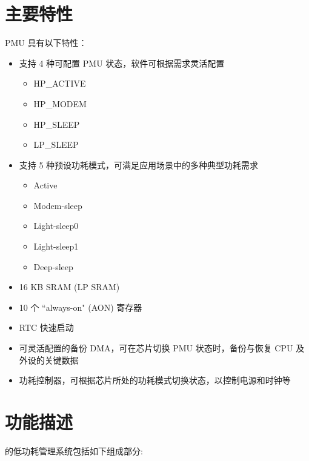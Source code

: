 \documentclass[main\_\_CN.tex]{subfiles}
\begin{document}
\section{主要特性}

PMU 具有以下特性：

\begin{itemize}
    \item 支持 4 种可配置 PMU 状态，软件可根据需求灵活配置
    \begin{itemize}
        \item HP\_ACTIVE
        \item HP\_MODEM
        \item HP\_SLEEP
        \item LP\_SLEEP
    \end{itemize}
    \item 支持 5 种预设功耗模式，可满足应用场景中的多种典型功耗需求
    \begin{itemize}
        \item Active
        \item Modem-sleep
        \item Light-sleep0
        \item Light-sleep1
        \item Deep-sleep
    \end{itemize}
    \item 16 KB SRAM (LP SRAM)
    \item 10 个 ``always-on" (AON) 寄存器
    \item RTC 快速启动
    \item 可灵活配置的备份 DMA，可在芯片切换 PMU 状态时，备份与恢复 CPU 及外设的关键数据
    \item 功耗控制器，可根据芯片所处的功耗模式切换状态，以控制电源和时钟等
\end{itemize}

\section{功能描述}

\chipname{} 的低功耗管理系统包括如下组成部分:
\end{document}
